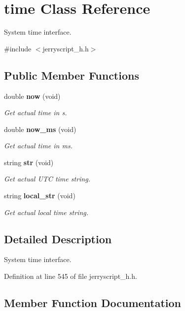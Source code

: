 \section{time Class Reference}
\label{classtime}


System time interface.  




{\ttfamily \#include $<$jerryscript\+\_\+h.\+h$>$}

\subsection*{Public Member Functions}
\begin{DoxyCompactItemize}
\item 
double \textbf{ now} (void)
\begin{DoxyCompactList}\small\item\em Get actual time in s. \end{DoxyCompactList}\item 
double \textbf{ now\+\_\+ms} (void)
\begin{DoxyCompactList}\small\item\em Get actual time in ms. \end{DoxyCompactList}\item 
string \textbf{ str} (void)
\begin{DoxyCompactList}\small\item\em Get actual U\+TC time string. \end{DoxyCompactList}\item 
string \textbf{ local\+\_\+str} (void)
\begin{DoxyCompactList}\small\item\em Get actual local time string. \end{DoxyCompactList}\end{DoxyCompactItemize}


\subsection{Detailed Description}
System time interface. 

Definition at line 545 of file jerryscript\+\_\+h.\+h.



\subsection{Member Function Documentation}
\mbox{\label{classtime_a90260b78bd47ed6283e47ac4a049e347}} 
